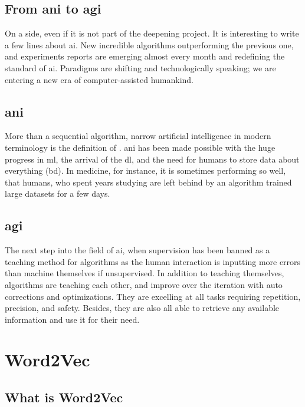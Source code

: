 \subsection{From \gls{ani} to \gls{agi}}
On a side, even if it is not part of the deepening project. It is interesting to write a few lines about \gls{ai}. New incredible algorithms outperforming the previous one, and experiments reports are emerging almost every month and redefining the standard of \gls{ai}. Paradigms are shifting and technologically speaking; we are entering a new era of computer-assisted humankind.

\subsection{\gls{ani}}
More than a sequential algorithm, narrow artificial intelligence in modern terminology is the definition of . \gls{ani} has been made possible with the huge progress in \gls{ml}, the arrival of the \gls{dl}, and the need for humans to store data about everything (\gls{bd}). In medicine, for instance, it is sometimes performing so well, that humans, who spent years studying are left behind by an algorithm trained large datasets for a few days.

\subsection{\gls{agi}}
The next step into the field of \gls{ai}, when supervision has been banned as a teaching method for algorithms as the human interaction is inputting more errors than machine themselves if unsupervised. In addition to teaching themselves, algorithms are teaching each other, and improve over the iteration with auto corrections and optimizations. They are excelling at all tasks requiring repetition, precision, and safety. Besides, they are also all able to retrieve any available information and use it for their need. 

\section{Word2Vec}
\subsection{What is Word2Vec}
